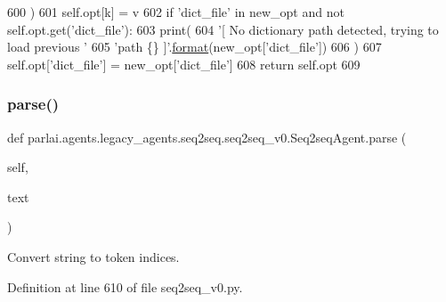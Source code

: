 \begin{DoxyCode}
600                 )
601             self.opt[k] = v
602         \textcolor{keywordflow}{if} \textcolor{stringliteral}{'dict\_file'} \textcolor{keywordflow}{in} new\_opt \textcolor{keywordflow}{and} \textcolor{keywordflow}{not} self.opt.get(\textcolor{stringliteral}{'dict\_file'}):
603             print(
604                 \textcolor{stringliteral}{'[ No dictionary path detected, trying to load previous '}
605                 \textcolor{stringliteral}{'path \{\} ]'}.\hyperlink{namespaceparlai_1_1chat__service_1_1services_1_1messenger_1_1shared__utils_a32e2e2022b824fbaf80c747160b52a76}{format}(new\_opt[\textcolor{stringliteral}{'dict\_file'}])
606             )
607             self.opt[\textcolor{stringliteral}{'dict\_file'}] = new\_opt[\textcolor{stringliteral}{'dict\_file'}]
608         \textcolor{keywordflow}{return} self.opt
609 
\end{DoxyCode}
\mbox{\label{classparlai_1_1agents_1_1legacy__agents_1_1seq2seq_1_1seq2seq__v0_1_1Seq2seqAgent_a073830870e283f88ee45a95c0ae8ad2f}} 
\subsubsection{\texorpdfstring{parse()}{parse()}}
{\footnotesize\ttfamily def parlai.\+agents.\+legacy\+\_\+agents.\+seq2seq.\+seq2seq\+\_\+v0.\+Seq2seq\+Agent.\+parse (\begin{DoxyParamCaption}\item[{}]{self,  }\item[{}]{text }\end{DoxyParamCaption})}

\begin{DoxyVerb}Convert string to token indices.
\end{DoxyVerb}
 

Definition at line 610 of file seq2seq\+\_\+v0.\+py.


